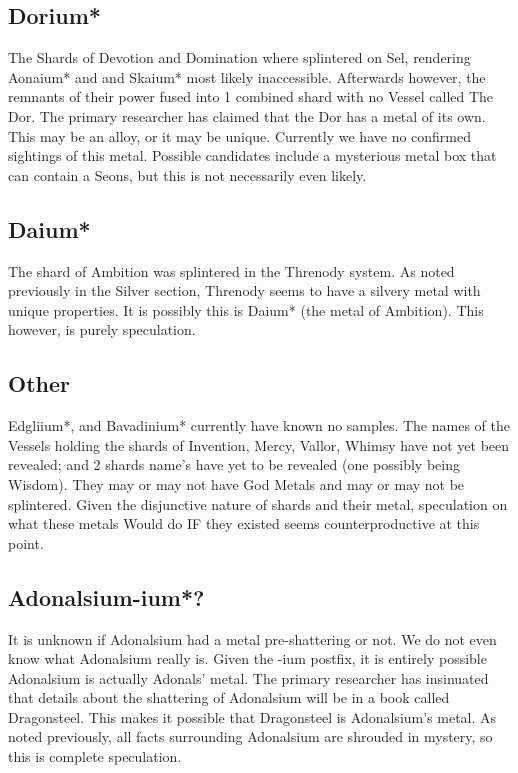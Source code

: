 \documentclass[conference]{IEEEtran}
\begin{document}
\subsection*{Dorium*}
The Shards of Devotion and Domination where splintered on Sel,\cite{arcanum-sel}\cite{WoK-ep22} rendering Aonaium* and and Skaium* most likely inaccessible.  Afterwards however, the remnants of their power fused into 1 combined shard with no Vessel called The Dor.\cite{arcanum-sel}  The primary researcher has claimed that the Dor has a metal of its own.\cite{dorium}  This may be an alloy, or it may be unique.  Currently we have no confirmed sightings of this metal.  Possible candidates include a mysterious metal box that can contain a Seons, but this is not necessarily even likely.  
\subsection*{Daium*}
The shard of Ambition was splintered in the Threnody system.\cite{arcanum-thren}  As noted previously in the Silver section, Threnody seems to have a silvery metal with unique properties.\cite{SFSFH-CH3}\cite{anchor}\cite{RoW-CH64}   It is possibly this is Daium* (the metal of Ambition).  This however, is purely speculation. 

\subsection*{Other}
Edgliium*, and Bavadinium* currently have known no samples.
The names of the Vessels holding the shards of Invention, Mercy, Vallor, Whimsy have not yet been revealed; and 2 shards name's have yet to be revealed (one possibly being Wisdom).  They may or may not have God Metals and may or may not be splintered.  Given the disjunctive nature of shards and their metal, speculation on what these metals Would do IF they existed seems counterproductive at this point.  

\subsection*{Adonalsium-ium*?}
It is unknown if Adonalsium had a metal pre-shattering or not.  We do not even know what Adonalsium really is.  Given the -ium postfix, it is entirely possible Adonalsium is actually Adonals' metal.  The primary researcher has insinuated that details about the shattering of Adonalsium will be in a book called Dragonsteel.  This makes it possible that Dragonsteel is Adonalsium's metal.
As noted previously, all facts surrounding Adonalsium are shrouded in mystery, so this is complete speculation.
\end{document}
